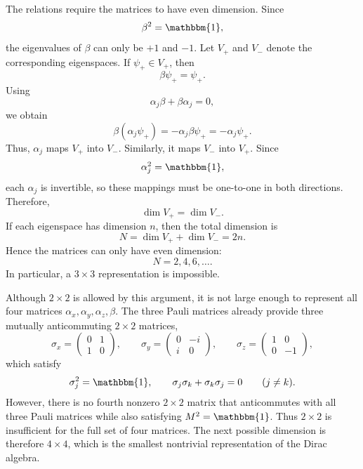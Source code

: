 \documentclass[12pt,a4paper]{article}
\begin{document}
	\begin{solution_pset}
		The relations require the matrices to have even dimension. Since
		\[
			\beta^2=\mathbbm{1},
		\]
		the eigenvalues of $\beta$ can only be $+1$ and $-1$. Let $V_+$ and $V_-$ denote the corresponding eigenspaces. If $\psi_+\in V_+$, then
		\[
			\beta\psi_+=\psi_+.
		\]
		Using
		\[
			\alpha_j\beta+\beta\alpha_j=0,
		\]
		we obtain
		\[
			\beta(\alpha_j\psi_+)
			=-\alpha_j\beta\psi_+
			=-\alpha_j\psi_+.
		\]
		Thus, $\alpha_j$ maps $V_+$ into $V_-$. Similarly, it maps $V_-$ into $V_+$. Since
		\[
			\alpha_j^2=\mathbbm{1},
		\]
		each $\alpha_j$ is invertible, so these mappings must be one-to-one in both directions. Therefore,
		\[
			\dim V_+=\dim V_-.
		\]
		If each eigenspace has dimension $n$, then the total dimension is
		\[
			N=\dim V_++\dim V_-=2n.
		\]
		Hence the matrices can only have even dimension:
		\[
			N=2,4,6,\ldots.
		\]
		In particular, a $3\times3$ representation is impossible.

		Although $2\times2$ is allowed by this argument, it is not large enough to represent all four matrices $\alpha_x,\alpha_y,\alpha_z,\beta$. The three Pauli matrices already provide three mutually anticommuting $2\times2$ matrices,
		\[
			\sigma_x=
			\begin{pmatrix}
				0&1\\
				1&0
			\end{pmatrix},
			\qquad
			\sigma_y=
			\begin{pmatrix}
				0&-i\\
				i&0
			\end{pmatrix},
			\qquad
			\sigma_z=
			\begin{pmatrix}
				1&0\\
				0&-1
			\end{pmatrix},
		\]
		which satisfy
		\[
			\sigma_j^2=\mathbbm{1},
			\qquad
			\sigma_j\sigma_k+\sigma_k\sigma_j=0
			\qquad (j\neq k).
		\]
		However, there is no fourth nonzero $2\times2$ matrix that anticommutes with all three Pauli matrices while also satisfying $M^2=\mathbbm{1}$. Thus $2\times2$ is insufficient for the full set of four matrices. The next possible dimension is therefore $4\times4$, which is the smallest nontrivial representation of the Dirac algebra.


\end{solution_pset}
\end{document}
